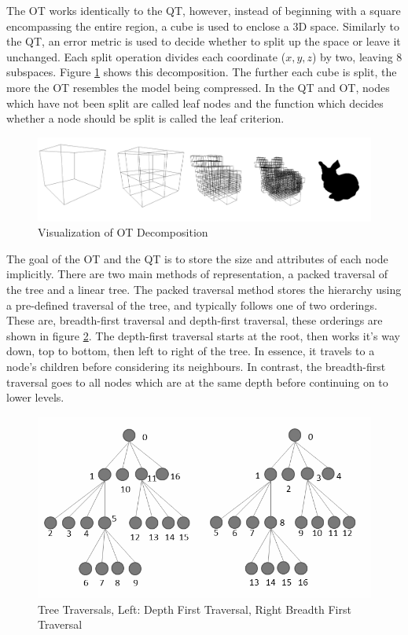The OT works identically to the QT, however, instead of beginning with a square encompassing the entire region, a cube is used to enclose a 3D space. Similarly to the QT, an error metric is used to decide whether to split up the space or leave it unchanged. Each split operation divides each coordinate ($x,y,z$) by two, leaving 8 subspaces. Figure \ref{OctreeExample} shows this decomposition. The further each cube is split, the more the OT resembles the model being compressed. In the QT and OT, nodes which have not been split are called leaf nodes and the function which decides whether a node should be split is called the leaf criterion. 

\begin{figure}[!htb]
\centering
\includegraphics[width=16cm]{images/ch2/OctreeExample}
\caption{Visualization of OT Decomposition}
\label{OctreeExample}
\end{figure}


The goal of the OT and the QT is to store the size and attributes of each node implicitly. There are two main methods of representation, a packed traversal of the tree and a linear tree. The packed traversal method stores the hierarchy using a pre-defined traversal of the tree, and typically follows one of two orderings. These are, breadth-first traversal and depth-first traversal, these orderings are shown in figure \ref{TreeTraversalExample}. The depth-first traversal starts at the root, then works it's way down, top to bottom, then left to right of the tree. In essence, it travels to a node's children before considering its neighbours. In contrast, the breadth-first traversal goes to all nodes which are at the same depth before continuing on to lower levels. 

\begin{figure}[!h]
\centering
\includegraphics[width=12cm]{images/ch2/TreeTraversalExample}
\caption{Tree Traversals, Left: Depth First Traversal, Right Breadth First Traversal}
\label{TreeTraversalExample}
\end{figure}

